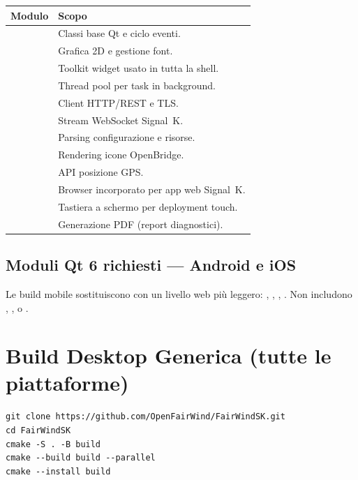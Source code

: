 \begin{longtable}{L{4.5cm}L{9.2cm}}
\toprule
{}
\color{white}\sffamily\bfseries Modulo &
\color{white}\sffamily\bfseries Scopo \\
\midrule
{}            & Classi base Qt e ciclo eventi. \\
             & Grafica 2D e gestione font. \\
         & Toolkit widget usato in tutta la shell. \\
      & Thread pool per task in background. \\
         & Client HTTP/REST e TLS. \\
      & Stream WebSocket Signal~K. \\
             & Parsing configurazione e risorse. \\
             & Rendering icone OpenBridge. \\
     & API posizione GPS. \\
& Browser incorporato per app web Signal~K. \\
 & Tastiera a schermo per deployment touch. \\
    & Generazione PDF (report diagnostici). \\
\bottomrule
\end{longtable}

\subsection{Moduli Qt 6 richiesti --- Android e iOS}

Le build mobile sostituiscono  con un livello web più leggero:
, , , .
Non includono , ,  o .

\section{Build Desktop Generica (tutte le piattaforme)}
\label{app:generica}

\begin{lstlisting}
git clone https://github.com/OpenFairWind/FairWindSK.git
cd FairWindSK
cmake -S . -B build
cmake --build build --parallel
cmake --install build
\end{lstlisting}

